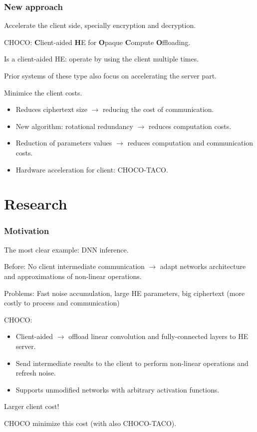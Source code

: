 \documentclass[10pt,handout]{beamer}
\begin{document}
\begin{frame}
\frametitle{New approach}
Accelerate the client side, specially encryption and decryption.

CHOCO: \textbf{C}lient-aided \textbf{H}E for \textbf{O}paque \textbf{C}ompute \textbf{O}ffloading.

Is a client-aided HE: operate by using the client multiple times.

Prior systems of these type also focus on accelerating the server part.

    Minimice the client costs.
\begin{itemize}\itemsep-0.7em
    \item Reduces ciphertext size $\rightarrow$ reducing the cost of communication.
    \item New algorithm: rotational redundancy $\rightarrow$ reduces computation costs.
    \item Reduction of parameters values $\rightarrow$ reduces computation and communication costs.
    \item Hardware acceleration for client: CHOCO-TACO.
\end{itemize}

\end{frame}




\section{Research}

\begin{frame}
\frametitle{Motivation}
The most clear example: DNN inference. %

Before: No client intermediate communication $\rightarrow$ adapt networks architecture and approximations of non-linear operations.

    Problems: Fast noise accumulation, large HE parameters, big ciphertext (more costly to process and communication)

CHOCO:
\begin{itemize}
    \item Client-aided $\rightarrow$ offload linear convolution and fully-connected layers to HE server.
    \item Send intermediate results to the client to perform non-linear operations and refresh noise.
    \item Supports unmodified networks with arbitrary activation functions.
\end{itemize}

Larger client cost!

    CHOCO minimize this cost (with also CHOCO-TACO).

\end{frame}
\end{document}
